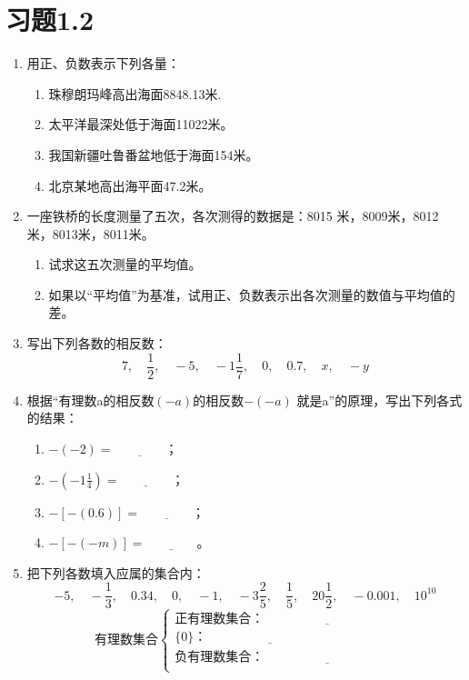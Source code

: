 \section*{习题1.2}
\begin{enumerate}
    \item 用正、负数表示下列各量：
    \begin{enumerate}
        \item 珠穆朗玛峰高出海面8848.13米.
        \item 太平洋最深处低于海面11022米。
        \item 我国新疆吐鲁番盆地低于海面154米。
        \item 北京某地高出海平面47.2米。
    \end{enumerate}
    \item 一座铁桥的长度测量了五次，各次测得的数据是：8015
    米，8009米，8012米，8013米，8011米。
    \begin{enumerate}
        \item 试求这五次测量的平均值。
        \item 如果以“平均值”为基准，试用正、负数表示出各次测量的数值与平均值的差。
    \end{enumerate}
\item 写出下列各数的相反数：
\[7,\quad \frac{1}{2},\quad -5,\quad -1\frac{1}{7},\quad 0,\quad 0.7,\quad x,\quad -y  \]
\item 根据“有理数a的相反数$(- a)$的相反数$-(-a)$
就是a”的原理，写出下列各式的结果：
 \begin{enumerate}
     \item $-(-2)=\underline{\qquad\qquad}$；
     \item $-\left(-1\frac{1}{4}\right)=\underline{\qquad\qquad}$；
     \item $-[-(0.6)]=\underline{\qquad\qquad}$；
     \item $-[-(-m)]=\underline{\qquad\qquad}$。
 \end{enumerate}
\item 把下列各数填入应属的集合内：
\[-5,\quad -\frac{1}{3},\quad 0.34,\quad 0,\quad -1,\quad -3\frac{2}{5},\quad \frac{1}{5},\quad 20\frac{1}{2},\quad -0.001,\quad 10^{10} \]
\[\text{有理数集合}\begin{cases}
    \text{正有理数集合：}\underline{\qquad\qquad\qquad\qquad\qquad}\\
    \{0\}： \underline{\qquad\qquad\qquad\qquad\qquad}\\    
    \text{负有理数集合：}\underline{\qquad\qquad\qquad\qquad\qquad}\\
\end{cases}\]



\end{enumerate}
